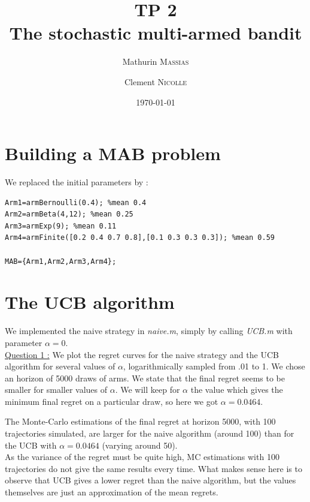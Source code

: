 \documentclass[11pt,a4paper]{article}
\title{TP 2 \\ The stochastic multi-armed bandit}
\author{Mathurin \textsc{Massias} \and Clement \textsc{Nicolle}}
\date{\today}
\begin{document}
\maketitle

\section{Building a MAB problem}
\hspace{-6mm} We replaced the initial parameters by :
\begin{verbatim}
Arm1=armBernoulli(0.4); %mean 0.4
Arm2=armBeta(4,12); %mean 0.25
Arm3=armExp(9); %mean 0.11
Arm4=armFinite([0.2 0.4 0.7 0.8],[0.1 0.3 0.3 0.3]); %mean 0.59

MAB={Arm1,Arm2,Arm3,Arm4};
\end{verbatim}

\section{The UCB algorithm}

\hspace{-6mm} We implemented the naive strategy in \textit{naive.m}, simply by calling \textit{UCB.m} with parameter $\alpha = 0$.
%
\\[5mm]
\underline{Question 1 :} We plot the regret curves for the naive strategy and the UCB algorithm for several values of $\alpha$, logarithmically sampled from .01 to 1. We chose an horizon of 5000 draws of arms. We state that the final regret seems to be smaller for smaller values of $\alpha$. We will keep for $\alpha$ the value which gives the minimum final regret on a particular draw, so here we got $\alpha = 0.0464$.

\medskip
The Monte-Carlo estimations of the final regret at horizon 5000, with 100 trajectories simulated, are larger for the naive algorithm (around 100) than for the UCB with $\alpha = 0.0464$ (varying around 50). 
\\
As the variance of the regret must be quite high, MC estimations with 100 trajectories do not give the same results every time. What makes sense here is to observe that UCB gives a lower regret than the naive algorithm, but the values themselves are just an approximation of the mean regrets.
\\
\end{document}
